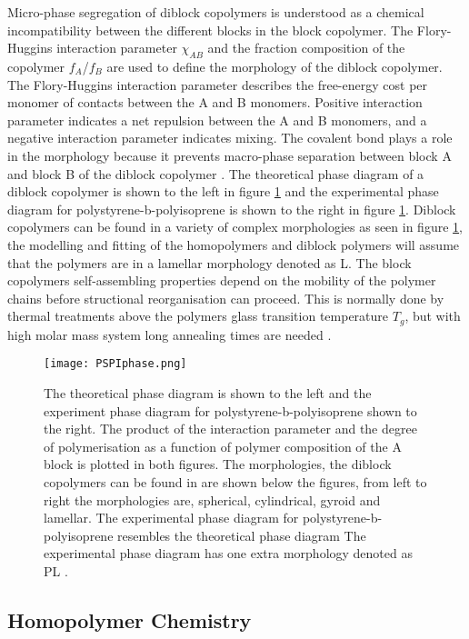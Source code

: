 \documentclass[MasterThesisMain.tex]{subfiles}
\begin{document}
Micro-phase segregation of diblock copolymers is understood as a chemical incompatibility between the different blocks in the block copolymer. The Flory-Huggins interaction parameter $\chi_{AB}$ and the fraction composition of the copolymer $f_A$/$f_B$ are used to define the morphology of the diblock copolymer. The Flory-Huggins interaction parameter describes the free-energy cost per monomer of contacts between the A and B monomers. Positive interaction parameter indicates a net repulsion between the A and B monomers, and a negative interaction parameter indicates mixing. The covalent bond plays a role in the morphology because it prevents macro-phase separation between block A and block B of the diblock copolymer \cite{designpolymers}. The theoretical phase diagram of a diblock copolymer is shown to the left in figure \ref{fig:blockfase} and the experimental phase diagram for polystyrene-b-polyisoprene is shown to the right in figure \ref{fig:blockfase}. Diblock copolymers can be found in a variety of complex morphologies as seen in figure \ref{fig:blockfase}, the modelling and fitting of the homopolymers and diblock polymers will assume that the polymers are in a lamellar morphology denoted as L. The block copolymers self-assembling properties depend on the mobility of the polymer chains before structional reorganisation can proceed. This is normally done by thermal treatments above the polymers glass transition temperature $T_g$, but with high molar mass system long annealing times are needed \cite{SVABCP}.

\begin{figure}[H]
\centering
\texttt{[image: PSPIphase.png]}
\caption{The theoretical phase diagram is shown to the left and the experiment phase diagram for polystyrene-b-polyisoprene shown to the right. The product of the interaction parameter and the degree of polymerisation as a function of polymer composition of the A block is plotted in both figures. The morphologies, the diblock copolymers can be found in are shown below the figures, from left to right the morphologies are, spherical, cylindrical, gyroid and lamellar. The experimental phase diagram for polystyrene-b-polyisoprene resembles the theoretical phase diagram The experimental phase diagram has one extra morphology denoted as PL \cite{designpolymers}.}
\label{fig:blockfase}
\end{figure}
 

\subsection{Homopolymer Chemistry}
\newcommand\setpolymerdelim[2]{\def\delimleft{#1}\def\delimright{#2}}
\def\makebraces[#1,#2]#3#4#5{%
\edef\delimhalfdim{\the\dimexpr(#1+#2)/2}%
\edef\delimvshift{\the\dimexpr(#1-#2)/2}%
\chemmove{%
\node[at=(#4),yshift=(\delimvshift)]
{$\left\delimleft\vrule height\delimhalfdim depth\delimhalfdim
width0pt\right.$};%
\node[at=(#5),yshift=(\delimvshift)]
{$\left.\vrule height\delimhalfdim depth\delimhalfdim
width0pt\right\delimright_{\rlap{$\scriptstyle#3$}}$};}}
\end{document}
